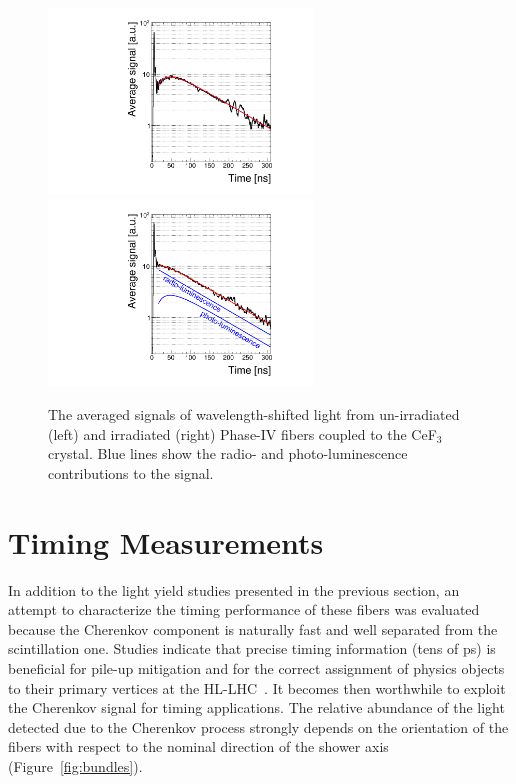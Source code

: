 \documentclass[a4paper,11pt]{article}
\begin{document}
\begin{figure}[ht]
\begin{center}
        \includegraphics[width=7cm]{Figures/CeF3coupledFibersUnirrad.pdf}
        \includegraphics[width=7cm]{Figures/CeF3coupledFibersIrrad.pdf}
    \caption{\small The averaged signals of wavelength-shifted light from un-irradiated (left) and irradiated (right) Phase-IV fibers coupled to the CeF$_3$ crystal. Blue lines show the radio- and photo-luminescence contributions to the signal. }
    \label{fig:CeF3signals}
\end{center}
\end{figure}

\section{Timing Measurements}
\label{sec:timing}
In addition to the light yield studies presented in the previous section, an attempt to characterize the timing performance of these fibers was evaluated because the Cherenkov component is naturally fast and well separated from the scintillation one. Studies indicate that precise timing information (tens of ps) is beneficial for pile-up mitigation and for the correct assignment of physics objects to their primary vertices at the HL-LHC~\cite{r-timingATLAS,r-timingCMS}. It becomes then worthwhile to exploit the Cherenkov signal for timing applications.  The relative abundance of the light detected due to the Cherenkov process  strongly depends on the orientation of the fibers with respect to the nominal direction of the shower axis (Figure~\ref{fig:bundles}). 
\end{document}
